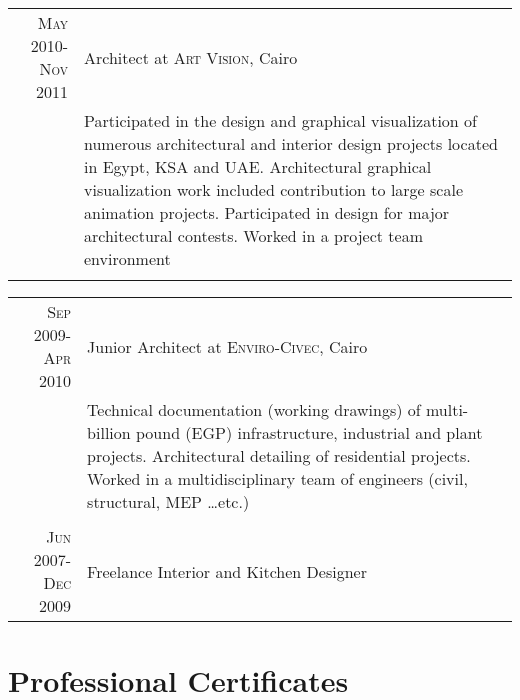 \documentclass[a4paper,11pt]{article} %
\begin{document}
\begin{tabular}{r|p{11cm}}

\textsc{May 2010-Nov 2011} & Architect at \textsc{Art Vision}, Cairo \emph{}\\
& \footnotesize{Participated in the design and graphical visualization of numerous architectural and interior design projects located in Egypt, KSA and UAE. Architectural graphical visualization work included contribution to large scale animation projects. Participated in design for major architectural contests. Worked in a project team environment}\\
\multicolumn{2}{c}{} \\
\end{tabular}


\newpage

\begin{tabular}{r|p{11cm}}
\textsc{Sep 2009-Apr 2010} & Junior Architect at \textsc{Enviro-Civec}, Cairo \emph{}\\
& \footnotesize{Technical documentation (working drawings) of multi-billion pound (EGP) infrastructure, industrial and plant projects. Architectural detailing of residential projects. Worked in a multidisciplinary team of engineers (civil, structural, MEP \ldots{}etc.)}\\
\multicolumn{2}{c}{} \\


\textsc{Jun 2007-Dec 2009} & Freelance Interior and Kitchen Designer\\
\end{tabular}



\vspace{1cm}
\section{Professional Certificates}
\end{document}
